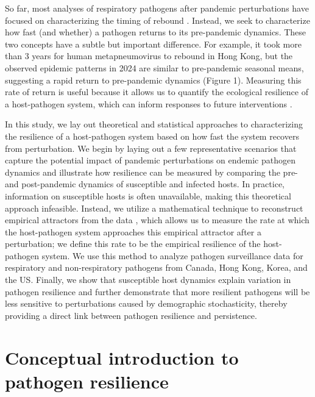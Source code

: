 \documentclass[12pt]{article}
\begin{document}
So far, most analyses of respiratory pathogens after pandemic perturbations have focused on characterizing the timing of rebound \citep{baker2020impact,eden2022off,perofsky2024impacts}.
Instead, we seek to characterize how fast (and whether) a pathogen returns to its pre-pandemic dynamics.
These two concepts have a subtle but important difference. 
For example, it took more than 3 years for human metapneumovirus to rebound in Hong Kong, but the observed epidemic patterns in 2024 are similar to pre-pandemic seasonal means, suggesting a rapid return to pre-pandemic dynamics (Figure 1).
Measuring this rate of return is useful because it allows us to quantify the ecological resilience of a host-pathogen system, which can inform responses to future interventions \citep{pimm1979structure, neubert1997alternatives,gunderson2000ecological,dakos2022ecological}.

In this study, we lay out theoretical and statistical approaches to characterizing the resilience of a host-pathogen system based on how fast the system recovers from perturbation.
We begin by laying out a few representative scenarios that capture the potential impact of pandemic perturbations on endemic pathogen dynamics and illustrate how resilience can be measured by comparing the pre- and post-pandemic dynamics of susceptible and infected hosts.
In practice, information on susceptible hosts is often unavailable, making this theoretical approach infeasible.
Instead, we utilize a mathematical technique to reconstruct empirical attractors from the data \citep{takens2006detecting}, which allows us to measure the rate at which the host-pathogen system approaches this empirical attractor after a perturbation;
we define this rate to be the empirical resilience of the host-pathogen system.
We use this method to analyze pathogen surveillance data for respiratory and non-respiratory pathogens from Canada, Hong Kong, Korea, and the US.
Finally, we show that susceptible host dynamics explain variation in pathogen resilience and further demonstrate that more resilient pathogens will be less sensitive to perturbations caused by demographic stochasticity, thereby providing a direct link between pathogen resilience and persistence. 
 
\section*{Conceptual introduction to pathogen resilience}
\end{document}
